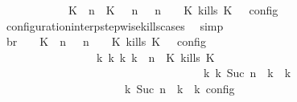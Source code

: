 \begin{isabellebody}
\ \ \ \ \ \ \ \ \ \ {\isasymunion}\ {\isasymlbrakk}\ {\isacharparenleft}{\isacharparenleft}K\ {\isasymUp}\ n{\isacharparenright}\ {\isacharhash}\ {\isacharparenleft}K\ {\isasymnot}{\isasymUp}\ {\isasymge}\ n{\isacharparenright}\ {\isacharhash}\ {\isasymGamma}{\isacharparenright}{\isacharcomma}\ n\ {\isasymturnstile}\ {\isasymPsi}\ {\isasymtriangleright}\ {\isacharparenleft}{\isacharparenleft}K\ kills\ K\ {\isacharhash}\ {\isasymPhi}{\isacharparenright}\ {\isasymrbrakk}\isactrlsub c\isactrlsub o\isactrlsub n\isactrlsub f\isactrlsub i\isactrlsub g{\isacartoucheclose}\isanewline
\ \ \ \ \ \ \ \ \isamarkupfalse%
\ configuration{\isacharunderscore}interp{\isacharunderscore}stepwise{\isacharunderscore}kills{\isacharunderscore}cases\ \isamarkupfalse%
\ simp\isanewline
\ \ \ \ \ \ \isamarkupfalse%
\ \isamarkupfalse%
\ br{}{\isacharcolon}\ {\isacartoucheopen}{\isasymrho}\ {\isasymin}\ {\isasymlbrakk}\ {\isacharparenleft}{\isacharparenleft}K\ {\isasymnot}{\isasymUp}\ n{\isacharparenright}\ {\isacharhash}\ {\isasymGamma}{\isacharparenright}{\isacharcomma}\ n\ {\isasymturnstile}\ {\isasymPsi}\ {\isasymtriangleright}\ {\isacharparenleft}{\isacharparenleft}K\ kills\ K\ {\isacharhash}\ {\isasymPhi}{\isacharparenright}\ {\isasymrbrakk}\isactrlsub c\isactrlsub o\isactrlsub n\isactrlsub f\isactrlsub i\isactrlsub g\isanewline
\ \ \ \ \ \ \ \ \ \ \ \ \ \ \ \ {\isasymLongrightarrow}\ {\isasymexists}{\isasymGamma}\isactrlsub k\ {\isasymPsi}\isactrlsub k\ {\isasymPhi}\isactrlsub k\ k{\isachardot}\ {\isacharparenleft}{\isacharparenleft}{\isasymGamma}{\isacharcomma}\ n\ {\isasymturnstile}\ {\isacharparenleft}{\isacharparenleft}K\ kills\ K\ {\isacharhash}\ {\isasymPsi}{\isacharparenright}\ {\isasymtriangleright}\ {\isasymPhi}{\isacharparenright}\isanewline
\ \ \ \ \ \ \ \ \ \ \ \ \ \ \ \ \ \ \ \ \ \ \ \ \ \ \ \ \ \ \ \ \ \ \ \ {\isasymhookrightarrow}\isactrlbsup k\isactrlesup \ {\isacharparenleft}{\isasymGamma}\isactrlsub k{\isacharcomma}\ Suc\ n\ {\isasymturnstile}\ {\isasymPsi}\isactrlsub k\ {\isasymtriangleright}\ {\isasymPhi}\isactrlsub k{\isacharparenright}{\isacharparenright}\isanewline
\ \ \ \ \ \ \ \ \ \ \ \ \ \ \ \ \ \ {\isasymand}\ {\isasymrho}\ {\isasymin}\ {\isasymlbrakk}\ {\isasymGamma}\isactrlsub k{\isacharcomma}\ Suc\ n\ {\isasymturnstile}\ {\isasymPsi}\isactrlsub k\ {\isasymtriangleright}\ {\isasymPhi}\isactrlsub k\ {\isasymrbrakk}\isactrlsub c\isactrlsub o\isactrlsub n\isactrlsub f\isactrlsub i\isactrlsub g{\isacartoucheclose}\isanewline

\end{isabellebody}
